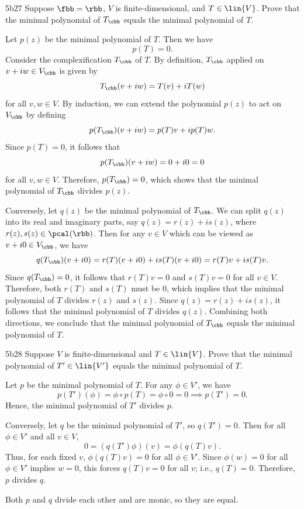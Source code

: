\begin{exercise}{5b27}
    Suppose $\fbb = \rbb$, $V$ is finite-dimensional, and $T \in \lin{V}$.
	Prove that the minimal polynomial of $T_\cbb$ equals the minimal polynomial of $T$.

\end{exercise}

\begin{sol}
    Let $p(z)$ be the minimal polynomial of $T$.
    Then we have
    \[
    	p(T) = 0.
    \]
    Consider the complexification $T_\cbb$ of $T$.
    By definition, $T_\cbb$ applied on $v + iw \in V_\cbb$ is given by
    \[
    	T_\cbb(v + iw) = T(v) + iT(w)
    \]
    for all $v, w \in V$. By induction, we can extend the polynomial $p(z)$ to act on $V_\cbb$ by defining
    \[
    	p(T_\cbb)(v + iw) = p(T)v + ip(T)w.
    \]
    Since $p(T) = 0$, it follows that
    \[
    	p(T_\cbb)(v + iw) = 0 + i0 = 0
    \]
    for all $v, w \in V$.
    Therefore, $p(T_\cbb) = 0$, which shows that the minimal polynomial of $T_\cbb$ divides $p(z)$.

    Conversely, let $q(z)$ be the minimal polynomial of $T_\cbb$.
    We can split $q(z)$ into its real and imaginary parts, say $q(z) = r(z) + is(z)$, where $r(z), s(z) \in \pcal(\rbb)$.
    Then for any $v \in V$ which can be viewed as $v + i0 \in V_\cbb$, we have
    \[
    	q(T_\cbb)(v + i0) = r(T)(v + i0) + is(T)(v + i0) = r(T)v + i s(T)v.
    \]
    Since $q(T_\cbb) = 0$, it follows that $r(T)v = 0$ and $s(T)v = 0$ for all $v \in V$.
    Therefore, both $r(T)$ and $s(T)$ must be $0$, which implies that the minimal polynomial of $T$ divides $r(z)$ and $s(z)$.
    Since $q(z) = r(z) + is(z)$, it follows that the minimal polynomial of $T$ divides $q(z)$.
    Combining both directions, we conclude that the minimal polynomial of $T_\cbb$ equals the minimal polynomial of $T$.
\end{sol}

\begin{exercise}{5b28}
    Suppose $V$ is finite-dimensional and $T \in \lin{V}$.
	Prove that the minimal polynomial of $T' \in \lin{V'}$ equals the minimal polynomial of $T$.

\end{exercise}

\begin{sol}
    Let $p$ be the minimal polynomial of $T$. For any $\phi \in V'$, we have
    \[
    	p(T')(\phi)=\phi \circ p(T)=\phi \circ 0=0 \implies p(T')=0.
    \]
    Hence, the minimal polynomial of $T'$ divides $p$.

    Conversely, let $q$ be the minimal polynomial of $T'$, so $q(T')=0$. Then for all $\phi \in V'$ and all $v \in V$,
    \[
    	0=\left(q(T') \phi \right)(v)=\phi \left(q(T) v \right).
    \]
    Thus, for each fixed $v$, $\phi(q(T)v)=0$ for all $\phi \in V'$.
    Since $\phi(w) = 0$ for all $\phi \in V'$ implies $w = 0$, this forces $q(T)v=0$ for all $v$; i.e., $q(T)=0$. Therefore, $p$ divides $q$.

    Both $p$ and $q$ divide each other and are monic, so they are equal.
\end{sol}

